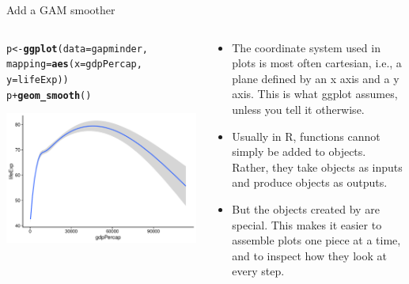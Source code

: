\documentclass[10pt]{beamer}\usepackage[]{graphicx}\usepackage[]{color}
\makeatletter
\def\maxwidth{ %
  \ifdim\Gin@nat@width>\linewidth
    \linewidth
  \else
    \Gin@nat@width
  \fi
}
\newcommand{\hlopt}[1]{\textcolor[rgb]{0,0,0}{#1}}%
\newcommand{\hlstd}[1]{\textcolor[rgb]{0.345,0.345,0.345}{#1}}%
\newcommand{\hlkwb}[1]{\textcolor[rgb]{0.69,0.353,0.396}{#1}}%
\newcommand{\hlkwc}[1]{\textcolor[rgb]{0.333,0.667,0.333}{#1}}%
\newcommand{\hlkwd}[1]{\textcolor[rgb]{0.737,0.353,0.396}{\textbf{#1}}}%
\newenvironment{kframe}{%
 \def\at@end@of@kframe{}%
 \ifinner\ifhmode%
  \def\at@end@of@kframe{\end{minipage}}%
  \begin{minipage}{\columnwidth}%
 \fi\fi%
 \def\FrameCommand##1{\hskip\@totalleftmargin \hskip-\fboxsep
 \colorbox{shadecolor}{##1}\hskip-\fboxsep
     \hskip-\linewidth \hskip-\@totalleftmargin \hskip\columnwidth}%
 \MakeFramed {\advance\hsize-\width
   \@totalleftmargin\z@ \linewidth\hsize
   \@setminipage}}%
 {\par\unskip\endMakeFramed%
 \at@end@of@kframe}
\newenvironment{knitrout}{}{} %
\makeatother
\begin{document}
\begin{frame}[fragile]{Add a GAM smoother}
	\begin{columns}
		\begin{column}{0.5\textwidth}  %
\begin{knitrout}\tiny
{}\color{fgcolor}\begin{kframe}
\begin{alltt}
\hlstd{p} \hlkwb{<-} \hlkwd{ggplot}\hlstd{(}\hlkwc{data} \hlstd{= gapminder,}
            \hlkwc{mapping} \hlstd{=} \hlkwd{aes}\hlstd{(}\hlkwc{x} \hlstd{= gdpPercap,}
                          \hlkwc{y}\hlstd{=lifeExp))}
\hlstd{p} \hlopt{+} \hlkwd{geom_smooth}\hlstd{()}
\end{alltt}


{\ttfamily\noindent\itshape{}}\end{kframe}

{\centering \includegraphics[width=\maxwidth]{figure/unnamed-chunk-7-1} 

}


\end{knitrout}
		\end{column}
		\begin{column}{0.5\textwidth}
			\begin{itemize}
					\item The coordinate system used in plots is most often cartesian, i.e., a plane defined by an x axis and a y axis. This is	what ggplot assumes, unless you tell it otherwise. \pause 
				\item Usually in R, functions cannot simply be added to objects. Rather, they take objects as inputs and produce objects as outputs.
				\item But the objects created by  are special. This makes it easier to assemble plots one piece at a time, and to inspect how they look at every step. 
			\end{itemize}
		\end{column}
	\end{columns}
\end{frame}
\end{document}
